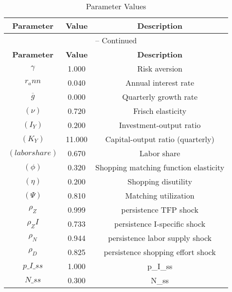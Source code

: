 \begin{center}
\begin{longtable}{ccc}
\caption{Parameter Values}\\%
\toprule%
\multicolumn{1}{c}{\textbf{Parameter}} &
\multicolumn{1}{c}{\textbf{Value}} &
 \multicolumn{1}{c}{\textbf{Description}}\\%
\midrule%
\endfirsthead
\multicolumn{3}{c}{{\tablename} \thetable{} -- Continued}\\%
\midrule%
\multicolumn{1}{c}{\textbf{Parameter}} &
\multicolumn{1}{c}{\textbf{Value}} &
  \multicolumn{1}{c}{\textbf{Description}}\\%
\midrule%
\endhead
${\gamma}$ 	 & 	 1.000 	 & 	 Risk aversion\\
${r_ann}$ 	 & 	 0.040 	 & 	 Annual interest rate\\
${\overline{g}}$ 	 & 	 0.000 	 & 	 Quarterly growth rate\\
$(\nu)$ 	 & 	 0.720 	 & 	 Frisch elasticity\\
$(I_Y)$ 	 & 	 0.200 	 & 	 Investment-output ratio\\
$(K_Y)$ 	 & 	 11.000 	 & 	 Capital-output ratio (quarterly)\\
$(labor share)$ 	 & 	 0.670 	 & 	 Labor share\\
$(\phi)$ 	 & 	 0.320 	 & 	 Shopping matching function elasticity\\
$(\eta)$ 	 & 	 0.200 	 & 	 Shopping disutility\\
$(\Psi)$ 	 & 	 0.810 	 & 	 Matching utilization\\
${\rho_Z}$ 	 & 	 0.999 	 & 	 persistence TFP shock\\
${\rho_ZI}$ 	 & 	 0.733 	 & 	 persistence I-specific shock\\
${\rho_N}$ 	 & 	 0.944 	 & 	 persistence labor supply shock\\
${\rho_D}$ 	 & 	 0.825 	 & 	 persistence shopping effort shock\\
$p\_I\_ss$ 	 & 	 1.000 	 & 	 p\_I\_ss\\
$N\_ss$ 	 & 	 0.300 	 & 	 N\_ss\\
\bottomrule%
\end{longtable}
\end{center}
